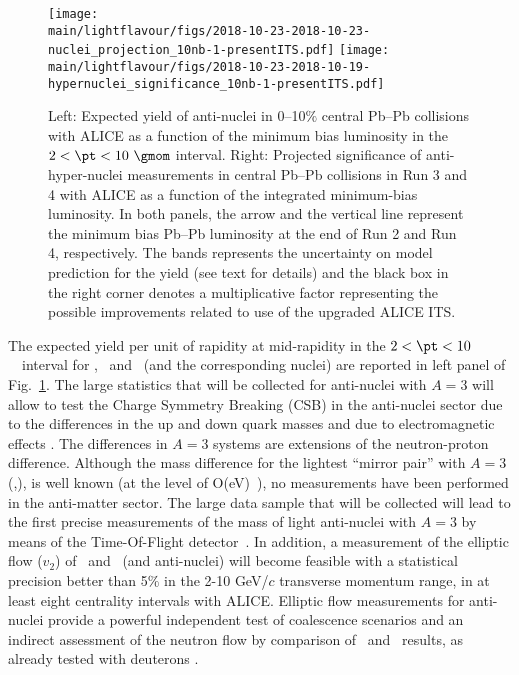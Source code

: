 \begin{figure}%
\begin{center}
\texttt{[image: \\main/lightflavour/figs/2018-10-23-2018-10-23-nuclei\_projection\_10nb-1-presentITS.pdf]}
\texttt{[image: \\main/lightflavour/figs/2018-10-23-2018-10-19-hypernuclei\_significance\_10nb-1-presentITS.pdf]}
\end{center}
\caption{Left: Expected yield of anti-nuclei in 0--10$\%$ central Pb--Pb collisions with ALICE as a function of the minimum bias luminosity in the $2 <\pt< 10~\gmom$ interval. 
Right: Projected significance of anti-hyper-nuclei measurements in central Pb--Pb collisions in Run 3 and 4 with ALICE as a function of the integrated minimum-bias luminosity. In both panels, the arrow and the vertical line represent the minimum bias Pb--Pb luminosity at the end of Run 2 and Run 4, respectively. The bands represents the uncertainty on model prediction for the yield (see text for details) and the black box in the right corner denotes a multiplicative factor representing the possible improvements related to use of the upgraded ALICE ITS.}
\label{fig:yieldrun34}
\end{figure}

The expected yield per unit of rapidity at mid-rapidity in the $2<\pt<10$~\gmom\ 
interval for \antid, \antihethree\ and \antihefour~(and the corresponding nuclei) 
are reported in left panel of Fig.~\ref{fig:yieldrun34}.
The large statistics that will be collected for anti-nuclei with $A = 3$  will allow 
to test the Charge Symmetry Breaking (CSB) in the anti-nuclei sector due to the differences in the 
up and down quark masses and due to electromagnetic effects \cite{Miller:1990ky}. 
The differences in $A = 3$ systems are extensions of the neutron-proton difference. 
Although the mass difference for the lightest ``mirror pair'' with $A = 3$ (\tritium,\hethree), 
is well known (at the level of O(eV)~\cite{Audi:2002rp}), no measurements have been performed in the anti-matter sector. 
The large data sample that will be collected will lead to the first precise measurements of the mass of light anti-nuclei with $A=3$ by means of the Time-Of-Flight detector~\cite{Adam:2015pna}.
%
In addition, a measurement of the elliptic flow ($v_2$) of \hethree~and \tritium~(and anti-nuclei) will become feasible with a statistical precision better than 5$\%$ in the 2-10 GeV/$c$ transverse momentum range, in at least eight centrality intervals with ALICE. Elliptic flow measurements for anti-nuclei provide a powerful independent test of coalescence scenarios and an indirect assessment of the neutron flow by comparison of \hethree~and \tritium~results, as already tested with deuterons \cite{Acharya:2017dmc}.

